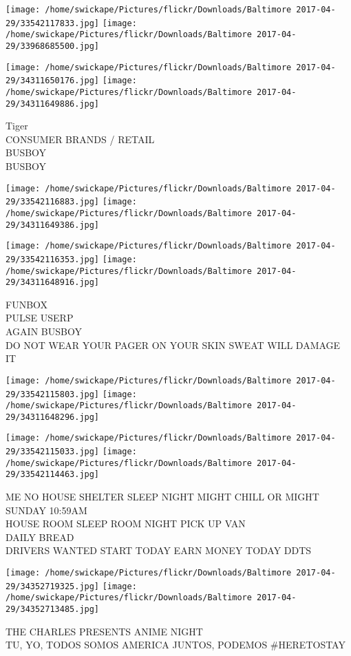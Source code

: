 \documentclass[10pt,letterpaper]{article}
\begin{document}
\texttt{[image: /home/swickape/Pictures/flickr/Downloads/Baltimore 2017-04-29/33542117833.jpg]}
\texttt{[image: /home/swickape/Pictures/flickr/Downloads/Baltimore 2017-04-29/33968685500.jpg]}

\texttt{[image: /home/swickape/Pictures/flickr/Downloads/Baltimore 2017-04-29/34311650176.jpg]}
\texttt{[image: /home/swickape/Pictures/flickr/Downloads/Baltimore 2017-04-29/34311649886.jpg]}

Tiger\\
CONSUMER BRANDS / RETAIL\\
BUSBOY\\
BUSBOY
\pagebreak

\texttt{[image: /home/swickape/Pictures/flickr/Downloads/Baltimore 2017-04-29/33542116883.jpg]}
\texttt{[image: /home/swickape/Pictures/flickr/Downloads/Baltimore 2017-04-29/34311649386.jpg]}

\texttt{[image: /home/swickape/Pictures/flickr/Downloads/Baltimore 2017-04-29/33542116353.jpg]}
\texttt{[image: /home/swickape/Pictures/flickr/Downloads/Baltimore 2017-04-29/34311648916.jpg]}

FUNBOX\\
PULSE USERP\\
AGAIN BUSBOY\\
DO NOT WEAR YOUR PAGER ON YOUR SKIN SWEAT WILL DAMAGE IT
\pagebreak

\texttt{[image: /home/swickape/Pictures/flickr/Downloads/Baltimore 2017-04-29/33542115803.jpg]}
\texttt{[image: /home/swickape/Pictures/flickr/Downloads/Baltimore 2017-04-29/34311648296.jpg]}

\texttt{[image: /home/swickape/Pictures/flickr/Downloads/Baltimore 2017-04-29/33542115033.jpg]}
\texttt{[image: /home/swickape/Pictures/flickr/Downloads/Baltimore 2017-04-29/33542114463.jpg]}

ME NO HOUSE SHELTER SLEEP NIGHT MIGHT CHILL OR MIGHT SUNDAY 10:59AM\\
HOUSE ROOM SLEEP ROOM NIGHT PICK UP VAN\\
DAILY BREAD\\
DRIVERS WANTED START TODAY EARN MONEY TODAY DDTS
\pagebreak

\texttt{[image: /home/swickape/Pictures/flickr/Downloads/Baltimore 2017-04-29/34352719325.jpg]}
\texttt{[image: /home/swickape/Pictures/flickr/Downloads/Baltimore 2017-04-29/34352713485.jpg]}

THE CHARLES PRESENTS ANIME NIGHT\\
TU, YO, TODOS SOMOS AMERICA JUNTOS, PODEMOS \#HERETOSTAY
\pagebreak
\end{document}
